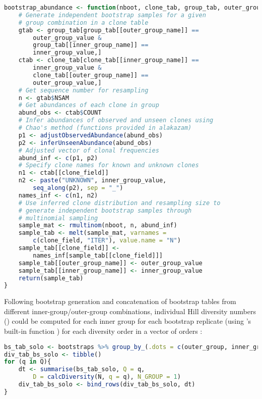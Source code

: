 \begin{lstlisting}[language=R]
bootstrap_abundance <- function(nboot, clone_tab, group_tab, outer_group_name, outer_group_value, inner_group_name, inner_group_value, clone_field){
	# Generate independent bootstrap samples for a given
	# group combination in a clone table
	gtab <- group_tab[group_tab[[outer_group_name]] == 
		outer_group_value & 
		group_tab[[inner_group_name]] == 
		inner_group_value,]
	ctab <- clone_tab[clone_tab[[inner_group_name]] == 
		inner_group_value & 
		clone_tab[[outer_group_name]] == 
		outer_group_value,]
	# Get sequence number for resampling
	n <- gtab$NSAM
	# Get abundances of each clone in group
	abund_obs <- ctab$COUNT
	# Infer abundances of observed and unseen clones using
	# Chao's method (functions provided in alakazam)
	p1 <- adjustObservedAbundance(abund_obs)
	p2 <- inferUnseenAbundance(abund_obs)
	# Adjusted vector of clonal frequencies
	abund_inf <- c(p1, p2)
	# Specify clone names for known and unknown clones
	n1 <- ctab[[clone_field]]
	n2 <- paste("UNKNOWN", inner_group_value,
		seq_along(p2), sep = "_")
	names_inf <- c(n1, n2)
	# Use inferred clone distribution and resampling size to 
	# generate independent bootstrap samples through
	# multinomial sampling
	sample_mat <- rmultinom(nboot, n, abund_inf)
	sample_tab <- melt(sample_mat, varnames = 
		c(clone_field, "ITER"), value.name = "N")
	sample_tab[[clone_field]] <- 
		names_inf[sample_tab[[clone_field]]]
	sample_tab[[outer_group_name]] <- outer_group_value
	sample_tab[[inner_group_name]] <- inner_group_value
	return(sample_tab)
}

\end{lstlisting}

\noindent Following bootstrap generation and concatenation of bootstrap tables from different inner-group/outer-group combinations, individual Hill diversity numbers () could be computed for each inner group for each bootstrap replicate (using 's built-in  function \parencite{gupta2015changeo,stern2014bcells}) for each diversity order in a vector of orders :

\begin{lstlisting}[language=R]
bs_tab_solo <- bootstraps %>% group_by_(.dots = c(outer_group, inner_group, "ITER"))
div_tab_bs_solo <- tibble()
for (q in Q){
	dt <- summarise(bs_tab_solo, Q = q, 
		D = calcDiversity(N, q = q), N_GROUP = 1)
	div_tab_bs_solo <- bind_rows(div_tab_bs_solo, dt)
}
\end{lstlisting}

